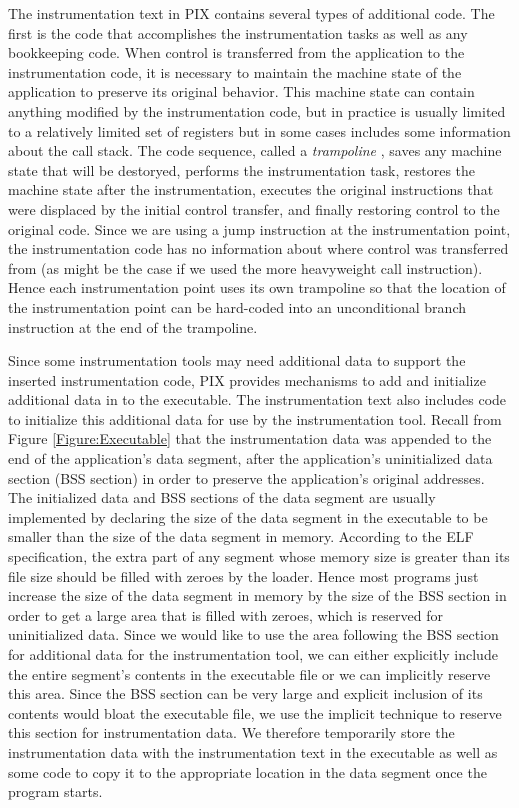 The instrumentation text in PIX contains several types of additional code. The first
is the code that accomplishes the instrumentation tasks as well as any bookkeeping code.
When control is transferred from the application to the
instrumentation code, it is necessary to maintain the machine state of
the application to preserve its original behavior. This machine state
can contain anything modified by the instrumentation code, but in practice is
usually limited to a relatively limited set of registers but in some cases includes
some information about the call stack. The code sequence, called a \textit{trampoline} \cite{buck2000api}, 
saves any machine state that will be destoryed, performs the instrumentation task, restores
the machine state after the instrumentation, executes the
original instructions that were displaced by the initial control transfer,
and finally restoring control to the original code. Since we are using a jump instruction at the instrumentation point, the
instrumentation code has no information about where control was transferred from
(as might be the case if we used the more heavyweight call instruction). Hence
each instrumentation point uses its own trampoline so that the location of the
instrumentation point can be hard-coded into an unconditional branch instruction
at the end of the trampoline.

Since some instrumentation tools may need additional data to support the inserted instrumentation code,
PIX provides mechanisms to add and initialize additional data in to the executable.
The instrumentation text also includes code to initialize this additional data for use by the
instrumentation tool. Recall from Figure \ref{Figure:Executable} that the instrumentation
data was appended to the end of the application's data segment, after the
application's uninitialized data section (BSS section) in order to preserve the application's 
original addresses. The initialized data and BSS
sections of the data segment are usually implemented by declaring the size of
the data segment in the executable to be smaller than the size of the data
segment in memory. According to the ELF specification\cite{standard1995executable}, the extra part of any
segment whose memory size is greater than its file size should be filled with
zeroes by the loader. Hence most programs just increase the size of the data
segment in memory by the size of the BSS section in order to get a large
area that is filled with zeroes, which  is reserved for uninitialized data. Since we
would like to use the area following the BSS section for additional
data for the instrumentation tool, we can either explicitly include the entire
segment's contents in the executable file or we can implicitly reserve this area.
Since the BSS section can be very large and explicit inclusion of its contents
would bloat the  executable file, we use the implicit
technique to reserve this section for instrumentation data. We therefore
temporarily store the instrumentation data with the instrumentation text in the
executable as well as some code to copy it to the appropriate location in the
data segment once the program starts.
